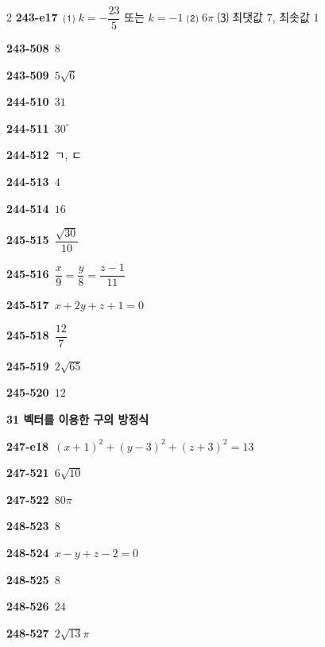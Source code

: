 \documentclass[10pt,a4paper]{article}
\begin{document}
\begin{multicols}{2}
\noindent\textbf{243-e17}\ ⑴ $k=-\dfrac{23}{5}$ 또는 $k=-1$ ⑵ $6\pi$ ⑶ 최댓값 $7$, 최솟값 $1$\par
\noindent\textbf{243-508}\ $8$\par
\noindent\textbf{243-509}\ $5\sqrt{6}$\par
\noindent\textbf{244-510}\ $31$\par
\noindent\textbf{244-511}\ $30^\circ$\par
\noindent\textbf{244-512}\ ㄱ, ㄷ\par
\noindent\textbf{244-513}\ $4$\par
\noindent\textbf{244-514}\ $16$\par
\noindent\textbf{245-515}\ $\dfrac{\sqrt{30}}{10}$\par
\noindent\textbf{245-516}\ $\dfrac{x}{9}=\dfrac{y}{8}=\dfrac{z-1}{11}$\par
\noindent\textbf{245-517}\ $x+2y+z+1=0$\par
\noindent\textbf{245-518}\ $\dfrac{12}{7}$\par
\noindent\textbf{245-519}\ $2\sqrt{65}$\par
\noindent\textbf{245-520}\ $12$\par
\noindent\textbf{31 벡터를 이용한 구의 방정식}\par\smallskip
\noindent\textbf{247-e18}\ $(x+1)^2+(y-3)^2+(z+3)^2=13$\par
\noindent\textbf{247-521}\ $6\sqrt{10}$\par
\noindent\textbf{247-522}\ $80\pi$\par
\noindent\textbf{248-523}\ $8$\par
\noindent\textbf{248-524}\ $x-y+z-2=0$\par
\noindent\textbf{248-525}\ $8$\par
\noindent\textbf{248-526}\ $24$\par
\noindent\textbf{248-527}\ $2\sqrt{13}\pi$\par
\end{multicols}
\end{document}
